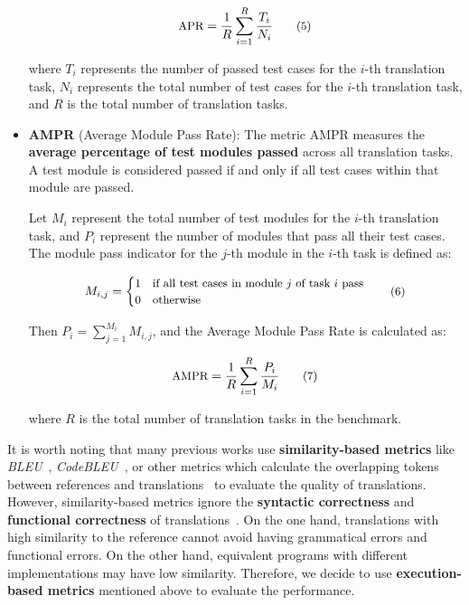 \begin{itemize}[left=10pt]
    \[
    \small
    \text{APR} = \frac{1}{R} \sum_{i=1}^{R} \frac{T_i}{N_i}
    \tag{5}
    \]
    
    where $T_i$ represents the number of passed test cases for the $i$-th translation task, $N_i$ represents the total number of test cases for the $i$-th translation task, and $R$ is the total number of translation tasks.

    \item \textbf{AMPR} (Average Module Pass Rate): The metric AMPR measures the \textbf{average percentage of test modules passed} across all translation tasks. A test module is considered passed if and only if all test cases within that module are passed.
    
    Let $M_i$ represent the total number of test modules for the $i$-th translation task, and $P_i$ represent the number of modules that pass all their test cases. The module pass indicator for the $j$-th module in the $i$-th task is defined as:
    
    \[
    \small
    M_{i,j} = \begin{cases}
    1 & \text{if all test cases in module } j \text{ of task } i \text{ pass} \\
    0 & \text{otherwise}
    \end{cases}
    \tag{6}
    \]
    
    Then $P_i = \sum_{j=1}^{M_i} M_{i,j}$, and the Average Module Pass Rate is calculated as:
    
    \[
    \small
    \text{AMPR} = \frac{1}{R} \sum_{i=1}^{R} \frac{P_i}{M_i}
    \tag{7}
    \]
    
    where $R$ is the total number of translation tasks in the benchmark.
    
\end{itemize}

It is worth noting that many previous works use \textbf{similarity-based metrics} like \textit{BLEU}~\cite{papineni2002bleu}, \textit{CodeBLEU}~\cite{ren2020codebleu}, or other metrics which calculate the overlapping tokens between references and translations~\cite{nguyen2013lexical,karaivanov2014phrase,barone2017parallel,aggarwal2015using,yan2023codetransocean} to evaluate the quality of translations. However, similarity-based metrics ignore the \textbf{syntactic correctness} and \textbf{functional correctness} of translations~\cite{lachaux2020transcoder}. On the one hand, translations with high similarity to the reference cannot avoid having grammatical errors and functional errors. On the other hand, equivalent programs with different implementations may have low similarity. Therefore, we decide to use \textbf{execution-based metrics} mentioned above to evaluate the performance.


